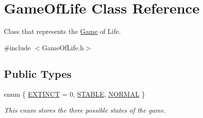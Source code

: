 \hypertarget{classGameOfLife}{}\section{Game\+Of\+Life Class Reference}
\label{classGameOfLife}


Class that represents the \hyperlink{classGame}{Game} of Life.  




{\ttfamily \#include $<$Game\+Of\+Life.\+h$>$}

\subsection*{Public Types}
\begin{DoxyCompactItemize}
\item 
enum \{ \hyperlink{classGameOfLife_ab9119586dc592398cd982530e3076831aa42b4c2d9a4b12ea3bf81060bc781e43}{E\+X\+T\+I\+N\+CT} = 0, 
\hyperlink{classGameOfLife_ab9119586dc592398cd982530e3076831afcc170e6cce7f91ad0995193873ef5a7}{S\+T\+A\+B\+LE}, 
\hyperlink{classGameOfLife_ab9119586dc592398cd982530e3076831adb669df0cff6f0440837322bfc241081}{N\+O\+R\+M\+AL}
 \}\begin{DoxyCompactList}\small\item\em This enum stores the three possible states of the game. \end{DoxyCompactList}
\end{DoxyCompactItemize}
